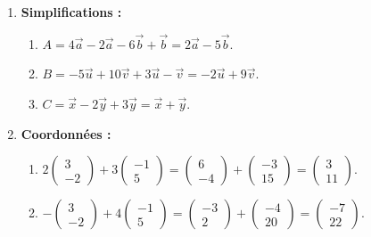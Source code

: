 \documentclass[11pt]{article}
\begin{document}
\begin{corrige}[Exercice n°1]
\begin{enumerate}
    \item \textbf{Simplifications :}
    \begin{enumerate}
        \item $A = 4\vec{a} - 2\vec{a} - 6\vec{b} + \vec{b} = 2\vec{a} - 5\vec{b}$.
        \item $B = -5\vec{u} + 10\vec{v} + 3\vec{u} - \vec{v} = -2\vec{u} + 9\vec{v}$.
        \item $C = \vec{x} - 2\vec{y} + 3\vec{y} = \vec{x} + \vec{y}$.
    \end{enumerate}
    \item \textbf{Coordonnées :}
    \begin{enumerate}
        \item $2\begin{pmatrix} 3 \\ -2 \end{pmatrix} + 3\begin{pmatrix} -1 \\ 5 \end{pmatrix} = \begin{pmatrix} 6 \\ -4 \end{pmatrix} + \begin{pmatrix} -3 \\ 15 \end{pmatrix} = \begin{pmatrix} 3 \\ 11 \end{pmatrix}$.
        \item $-\begin{pmatrix} 3 \\ -2 \end{pmatrix} + 4\begin{pmatrix} -1 \\ 5 \end{pmatrix} = \begin{pmatrix} -3 \\ 2 \end{pmatrix} + \begin{pmatrix} -4 \\ 20 \end{pmatrix} = \begin{pmatrix} -7 \\ 22 \end{pmatrix}$.

\end{enumerate}
\end{enumerate}
\end{corrige}
\end{document}
